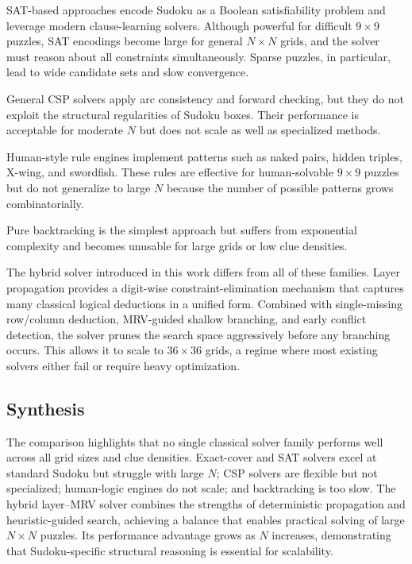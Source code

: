 \documentclass[11pt]{article}
\begin{document}
SAT-based approaches \cite{een2003sat,soos2010cryptominisat} encode Sudoku as a
Boolean satisfiability problem and leverage modern clause-learning solvers.
Although powerful for difficult $9 \times 9$ puzzles, SAT encodings become large
for general $N \times N$ grids, and the solver must reason about all constraints
simultaneously. Sparse puzzles, in particular, lead to wide candidate sets and
slow convergence.

General CSP solvers \cite{russellnorvig} apply arc consistency and forward
checking, but they do not exploit the structural regularities of Sudoku boxes.
Their performance is acceptable for moderate $N$ but does not scale as well as
specialized methods.

Human-style rule engines \cite{berthier2007} implement patterns such as naked
pairs, hidden triples, X-wing, and swordfish. These rules are effective for
human-solvable $9 \times 9$ puzzles but do not generalize to large $N$ because
the number of possible patterns grows combinatorially.

Pure backtracking is the simplest approach but suffers from exponential
complexity and becomes unusable for large grids or low clue densities.

The hybrid solver introduced in this work differs from all of these families.
Layer propagation provides a digit-wise constraint-elimination mechanism that
captures many classical logical deductions in a unified form. Combined with
single-missing row/column deduction, MRV-guided shallow branching, and early
conflict detection, the solver prunes the search space aggressively before any
branching occurs. This allows it to scale to $36 \times 36$ grids, a regime where
most existing solvers either fail or require heavy optimization.

\subsection{Synthesis}

The comparison highlights that no single classical solver family performs well
across all grid sizes and clue densities. Exact-cover and SAT solvers excel at
standard Sudoku but struggle with large $N$; CSP solvers are flexible but not
specialized; human-logic engines do not scale; and backtracking is too slow.
The hybrid layer--MRV solver combines the strengths of deterministic propagation
and heuristic-guided search, achieving a balance that enables practical solving
of large $N \times N$ puzzles. Its performance advantage grows as $N$ increases,
demonstrating that Sudoku-specific structural reasoning is essential for
scalability.
\end{document}
